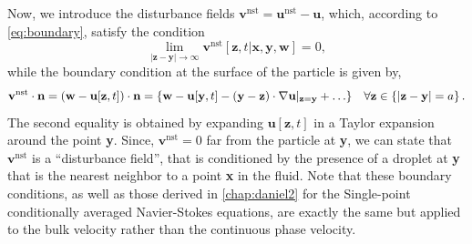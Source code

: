 Now, we introduce the disturbance fields $\textbf{v}^\text{nst} = \textbf{u}^\text{nst} - \textbf{u}$, which, according to  \ref{eq:boundary}, satisfy the condition
\begin{equation}
    \lim_{|\textbf{z} - \textbf{y}|\to \infty}
    \textbf{v}^\text{nst}[\textbf{z},t|\textbf{x},\textbf{y},\textbf{w}]
    = 0,
\end{equation}
while the boundary condition at the surface of the particle is given by, 
\begin{equation}
    \textbf{v}^\text{nst}\cdot \textbf{n}
    = 
    (\textbf{w} - \textbf{u}[\textbf{z},t])\cdot \textbf{n}
    = 
    \left\{
        \textbf{w}
        - \textbf{u}[\textbf{y},t]
        - (\textbf{y} - \textbf{z})\cdot \grad\textbf{u}|_{\textbf{z}=\textbf{y}}
        + \ldots 
    \right\}
    \;\;\; \forall \textbf{z}\in \left\{ |\textbf{z} - \textbf{y}| = a  \right\}. 
    \label{eq:bounday2}
\end{equation}
The second equality is obtained by expanding $ \textbf{u}[\textbf{z},t]$ in a Taylor expansion around the point \textbf{y}. 
Since, $\textbf{v}^\text{nst} = 0$ far from the particle at \textbf{y}, we can state that  $\textbf{v}^\text{nst}$ is a ``disturbance field'', that is conditioned by the presence of a droplet at \textbf{y} that is the nearest neighbor to a point \textbf{x} in the fluid. 
Note that these boundary conditions, as well as those derived in \ref{chap:daniel2} for the Single-point conditionally averaged Navier-Stokes equations, are exactly the same but applied to the bulk velocity rather than the continuous phase velocity.

